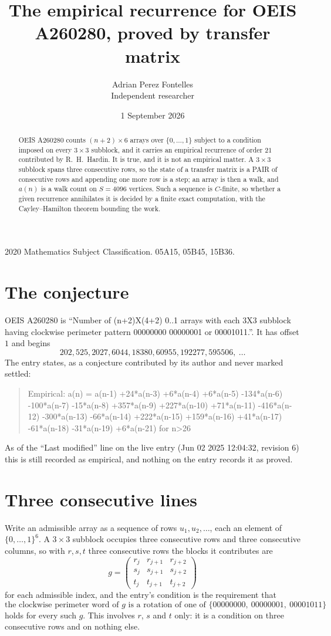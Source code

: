 \documentclass[11pt,a4paper]{article}
\title{The empirical recurrence for OEIS A260280, proved by transfer matrix}
\author{Adrian Perez Fontelles\\ \small Independent researcher}
\date{1 September 2026}
\theoremstyle{plain}
\theoremstyle{definition}
\begin{document}
\maketitle

\begin{abstract}
OEIS A260280 counts $(n+2)\times6$ arrays over $\{0,\dots,1\}$ subject to a condition imposed on
every $3\times3$ subblock, and it carries an empirical recurrence of order $21$
contributed by R.~H.~Hardin. It is true, and it is not an empirical matter. A $3\times3$
subblock spans three consecutive rows, so the state of a transfer matrix is a PAIR of
consecutive rows and appending one more row is a step; an array is then a walk, and
$a(n)$ is a walk count on $S=4096$ vertices. Such a sequence is $C$-finite, so whether a given
recurrence annihilates it is decided by a finite exact computation, with the Cayley--Hamilton
theorem bounding the work.
\end{abstract}

\noindent\small 2020 Mathematics Subject Classification. 05A15, 05B45, 15B36.\normalsize

\section{The conjecture}

OEIS A260280 is ``Number of (n+2)X(4+2) 0..1 arrays with each 3X3 subblock having clockwise perimeter pattern 00000000 00000001 or 00001011.''. It has offset $1$ and begins
\[
202, 525, 2027, 6044, 18380, 60955, 192277, 595506,\ \dots
\]
The entry states, as a conjecture contributed by its author and never marked settled:
\begin{quote}
Empirical: a(n) = a(n-1) +24*a(n-3) +6*a(n-4) +6*a(n-5) -134*a(n-6) -100*a(n-7) -15*a(n-8) +357*a(n-9) +227*a(n-10) +71*a(n-11) -416*a(n-12) -300*a(n-13) -66*a(n-14) +222*a(n-15) +159*a(n-16) +41*a(n-17) -61*a(n-18) -31*a(n-19) +6*a(n-21) for n>26
\end{quote}
As of the ``Last modified'' line on the live entry (Jun 02 2025 12:04:32, revision 6) this is still
recorded as empirical, and nothing on the entry records it as proved.

\section{Three consecutive lines}

Write an admissible array as a sequence of rows $u_1,u_2,\dots$, each an element of
$\{0,\dots,1\}^{6}$. A $3\times3$ subblock occupies three consecutive rows and
three consecutive columns, so with $r,s,t$ three consecutive rows the blocks it
contributes are
\[
g=\begin{pmatrix}r_j&r_{j+1}&r_{j+2}\\ s_j&s_{j+1}&s_{j+2}\\ t_j&t_{j+1}&t_{j+2}\end{pmatrix}
\]
for each admissible index, and the entry's condition is the requirement that
\[
\text{the clockwise perimeter word of }g\text{ is a rotation of one of }\{00000000,\ 00000001,\ 00001011\}
\]
holds for every such $g$. This involves $r$, $s$ and $t$ only: it is a condition on
three consecutive rows and on nothing else.
\end{document}
